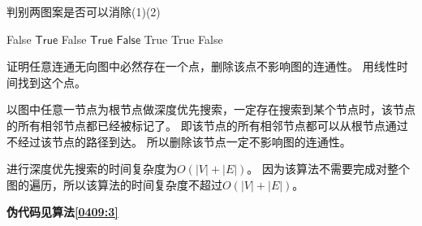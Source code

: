 \begin{questions}
    \begin{algorithm}[!htp]
        \caption{判别两图案是否可以消除(1)(2)} \label{0409:2:12}
        \begin{algorithmic}[1]
             
            \State \Return \textsf{False}
            \EndIf
            \EndFor
            \State \Return $\mathsf{True}$
             
            \State \Return \textsf{False}
            \EndIf
            \EndFor
            \State \Return $\mathsf{True}$
            \Else {}
            \State \Return $\mathsf{False}$
            \EndIf
            \EndProcedure
            \Statex
            \State \Return \textsf{True}
            \State \Return \textsf{True}
            \EndIf
            \State \Return \textsf{False}
            \EndProcedure
        \end{algorithmic}
    \end{algorithm}

    \question 证明任意连通无向图中必然存在一个点，删除该点不影响图的连通性。
    用线性时间找到这个点。

    \begin{solution}
        以图中任意一节点为根节点做深度优先搜索，一定存在搜索到某个节点时，该节点的所有相邻节点都已经被标记了。
        即该节点的所有相邻节点都可以从根节点通过不经过该节点的路径到达。
        所以删除该节点一定不影响图的连通性。

        进行深度优先搜索的时间复杂度为$O(|V|+|E|)$。
        因为该算法不需要完成对整个图的遍历，所以该算法的时间复杂度不超过$O(|V|+|E|)$。

        \textbf{伪代码见算法\ref{0409:3}}
    \end{solution}


\end{questions}
